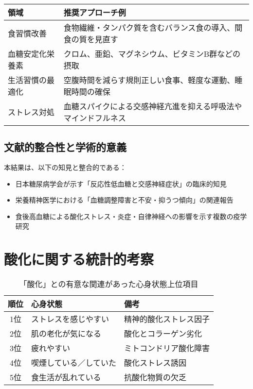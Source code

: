 \documentclass[a4paper,12pt]{article}
\begin{document}
\begin{table}[H]
\centering
\begin{tabular}{|l|p{10cm}|}
\hline
領域 & 推奨アプローチ例 \\
\hline
食習慣改善 & 食物繊維・タンパク質を含むバランス食の導入、間食の質を見直す \\
血糖安定化栄養素 & クロム、亜鉛、マグネシウム、ビタミンB群などの摂取 \\
生活習慣の最適化 & 空腹時間を減らす規則正しい食事、軽度な運動、睡眠時間の確保 \\
ストレス対処 & 血糖スパイクによる交感神経亢進を抑える呼吸法やマインドフルネス \\
\hline
\end{tabular}
\end{table}

\subsection*{文献的整合性と学術的意義}

本結果は、以下の知見と整合的である：

\begin{itemize}
  \item 日本糖尿病学会が示す「反応性低血糖と交感神経症状」の臨床的知見
  \item 栄養精神医学における「血糖調整障害と不安・抑うつ傾向」の関連報告
  \item 食後高血糖による酸化ストレス・炎症・自律神経への影響を示す複数の疫学研究
\end{itemize}


\section{酸化に関する統計的考察}

\begin{table}[H]
\centering
\begin{tabular}{|c|l|l|}
\hline
順位 & 心身状態 & 備考 \\
\hline
1位 & ストレスを感じやすい & 精神的酸化ストレス因子 \\
2位 & 肌の老化が気になる & 酸化とコラーゲン劣化 \\
3位 & 疲れやすい & ミトコンドリア酸化障害 \\
4位 & 喫煙している／していた & 酸化ストレス誘因 \\
5位 & 食生活が乱れている & 抗酸化物質の欠乏 \\
\hline
\end{tabular}
\caption{「酸化」との有意な関連があった心身状態上位項目}
\end{table}
\end{document}
